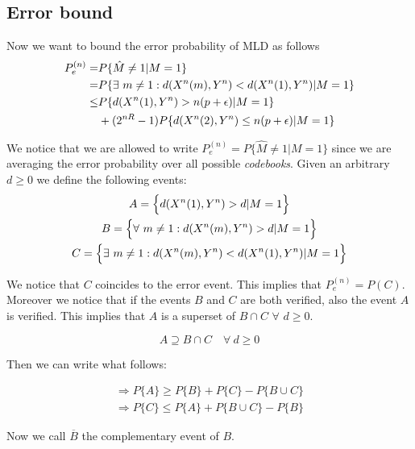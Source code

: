 \subsection{Error bound}

Now we want to bound the error probability of MLD as follows
%
\begin{equation}
	\begin{aligned}
	P_e^{(n)} =&P\{\hat{M}\neq 1 | M = 1\} \\
	=& P \{ \exists \ m \neq 1 : d(X^n(m),Y^n) < d(X^n(1),Y^n) | M=1 \}\\
	\leq& P \{ d(X^n(1),Y^n) >n(p+\epsilon)|M=1\}\\
	&+(2^{nR}-1)P \{ d(X^n(2),Y^n) \leq n(p+\epsilon)|M=1\}
	\end{aligned}
	\label{eq:3.5bound}
\end{equation}

We notice that we are allowed to write $P_e^{(n)}  =P \{\hat{M}\neq 1 | M = 1\}$ since we are averaging the error probability over all possible \textit{codebooks}. Given an arbitrary $d \geq 0$ we define the following events:
%
\begin{gather*}
	A = \Big \{ d(X^n(1),Y^n)>d | M = 1\Big \} \\
	B = \Big \{ \forall \  m \neq 1 : d(X^n(m),Y^n)>d | M=1 \Big \} \\
 	C = \Big\{ \exists \ m \neq 1 : d(X^n(m),Y^n) < d(X^n(1),Y^n) | M=1 \Big \}
\end{gather*}

We notice that $C$ coincides to the error event. This implies that $P_e^{(n)}=P(C)$. Moreover we notice that if the events $B$ and $C$ are both verified, also the event $A$ is verified. This implies that $A$ is a superset of  $B\cap C$ $\forall$ $d \geq 0$.

\begin{equation}
		A \supseteq B \cap C \quad \forall \  d\geq0
	\label{eq:3.5condition}
\end{equation}

Then we can write what follows:

\begin{equation}
	\begin{gathered}
		\Rightarrow P \{ A \} \geq P\{B\}+P\{C \} - P \{ B \cup C \} \\
		\Rightarrow P \{ C \} \leq P \{ A \} + P \{ B \cup C \} - P\{B \}
	\end{gathered}
\end{equation}

Now we call $\overline{B}$ the complementary event of  $B$.

